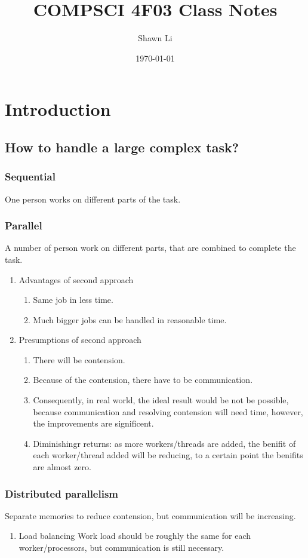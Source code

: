 \documentclass[11pt]{article}
\author{Shawn Li}
\date{\today}
\title{COMPSCI 4F03 Class Notes}
\begin{document}
\maketitle
\tableofcontents


\section{Introduction}
\label{sec:orgd2d918e}
\subsection{How to handle a large complex task?}
\label{sec:orgbe5ac55}
\subsubsection{Sequential}
\label{sec:org0bee5ae}
One person works on different parts of the task.
\subsubsection{Parallel}
\label{sec:org5f3d317}
A number of person work on different parts, that are combined to complete the task.
\begin{enumerate}
\item Advantages of second approach
\label{sec:orgb7f0917}
\begin{enumerate}
\item Same job in less time.
\item Much bigger jobs can be handled in reasonable time.
\end{enumerate}
\item Presumptions of second approach
\label{sec:org2b48037}
\begin{enumerate}
\item There will be contension.
\item Because of the contension, there have to be communication.
\item Consequently, in real world, the ideal result would be not be possible, because communication
and resolving contension will need time, however, the improvements are significent.
\item Diminishingr returns: as more workers/threads are added, the benifit of each worker/thread added
will be reducing, to a certain point the benifits are almost zero.
\end{enumerate}
\end{enumerate}
\subsubsection{Distributed parallelism}
\label{sec:org92a86b2}
Separate memories to reduce contension, but communication will be increasing.
\begin{enumerate}
\item Load balancing
\label{sec:orge86e239}
Work load should be roughly the same for each worker/processors, but communication is still necessary.
\end{enumerate}
\end{document}

